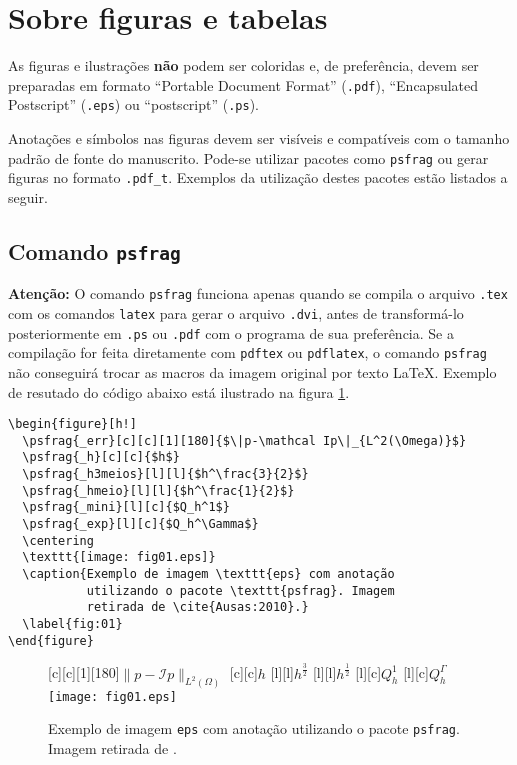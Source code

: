\documentclass{TEMA}
\begin{document}
\newpage
\section{Sobre figuras e tabelas}

As figuras e ilustrações {\bf não} podem ser coloridas e, de
preferência, devem ser preparadas em formato ``Portable 
Document Format'' (\texttt{.pdf}), ``Encapsulated
Postscript'' (\texttt{.eps}) ou ``postscript'' (\texttt{.ps}).

Anotações e símbolos nas figuras devem ser visíveis e compatíveis
com o tamanho padrão de fonte do manuscrito. Pode-se utilizar 
pacotes como \texttt{psfrag} ou gerar figuras no formato
\texttt{.pdf\_t}. Exemplos da utilização destes pacotes 
estão listados a seguir.

\subsection{Comando \texttt{psfrag}}

\noindent\textbf{Atenção:} O comando \texttt{psfrag} funciona
apenas quando se compila o arquivo \texttt{.tex} com os comandos
\texttt{latex} para gerar o arquivo \texttt{.dvi}, antes de 
transformá-lo posteriormente em \texttt{.ps} ou \texttt{.pdf}
com o programa de sua preferência. Se a compilação for feita 
diretamente com \texttt{pdftex} ou \texttt{pdflatex}, o 
comando \texttt{psfrag} não conseguirá trocar as macros da 
imagem original por texto \LaTeX. Exemplo de resutado do 
código abaixo está ilustrado na figura \ref{fig:01}.

\begin{framed}
\begin{verbatim}
\begin{figure}[h!]
  \psfrag{_err}[c][c][1][180]{$\|p-\mathcal Ip\|_{L^2(\Omega)}$}
  \psfrag{_h}[c][c]{$h$}
  \psfrag{_h3meios}[l][l]{$h^\frac{3}{2}$}
  \psfrag{_hmeio}[l][l]{$h^\frac{1}{2}$}
  \psfrag{_mini}[l][c]{$Q_h^1$}
  \psfrag{_exp}[l][c]{$Q_h^\Gamma$}
  \centering
  \texttt{[image: fig01.eps]}
  \caption{Exemplo de imagem \texttt{eps} com anotação 
           utilizando o pacote \texttt{psfrag}. Imagem
           retirada de \cite{Ausas:2010}.}
  \label{fig:01}
\end{figure}
\end{verbatim}
\end{framed}


\begin{figure}[h!]
  [c][c][1][180]{$\|p-\mathcal Ip\|_{L^2(\Omega)}$}
  [c][c]{$h$}
  [l][l]{$h^\frac{3}{2}$}
  [l][l]{$h^\frac{1}{2}$}
  [l][c]{$Q_h^1$}
  [l][c]{$Q_h^\Gamma$}
  \centering
  \texttt{[image: fig01.eps]}
  \caption{Exemplo de imagem \texttt{eps} com anotação 
           utilizando o pacote \texttt{psfrag}. Imagem
           retirada de \cite{Ausas:2010}.}
  \label{fig:01}
\end{figure}
\end{document}
